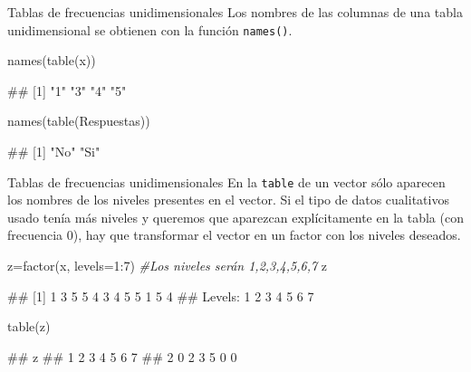 \documentclass[
  ignorenonframetext,
  aspectratio=169]{beamer}
\newenvironment{Shaded}{\begin{snugshade}}{\end{snugshade}}
\newcommand{\AttributeTok}[1]{\textcolor[rgb]{0.77,0.63,0.00}{#1}}
\newcommand{\CommentTok}[1]{\textcolor[rgb]{0.56,0.35,0.01}{\textit{#1}}}
\newcommand{\DecValTok}[1]{\textcolor[rgb]{0.00,0.00,0.81}{#1}}
\newcommand{\FunctionTok}[1]{\textcolor[rgb]{0.00,0.00,0.00}{#1}}
\newcommand{\NormalTok}[1]{#1}
\newcommand{\OtherTok}[1]{\textcolor[rgb]{0.56,0.35,0.01}{#1}}
\newcommand{\SpecialCharTok}[1]{\textcolor[rgb]{0.00,0.00,0.00}{#1}}
\let\oldverbatim\verbatim
\let\endoldverbatim\endverbatim
\renewenvironment{verbatim}{\tiny\oldverbatim}{\endoldverbatim}
\begin{document}
\begin{frame}[fragile]{Tablas de frecuencias unidimensionales}
\protect\hypertarget{tablas-de-frecuencias-unidimensionales-3}{}
Los nombres de las columnas de una tabla unidimensional se obtienen con
la función \texttt{names()}.

\begin{Shaded}
\begin{Highlighting}[]
\FunctionTok{names}\NormalTok{(}\FunctionTok{table}\NormalTok{(x))}
\end{Highlighting}
\end{Shaded}

\begin{verbatim}
## [1] "1" "3" "4" "5"
\end{verbatim}

\begin{Shaded}
\begin{Highlighting}[]
\FunctionTok{names}\NormalTok{(}\FunctionTok{table}\NormalTok{(Respuestas))}
\end{Highlighting}
\end{Shaded}

\begin{verbatim}
## [1] "No" "Si"
\end{verbatim}
\end{frame}

\begin{frame}[fragile]{Tablas de frecuencias unidimensionales}
\protect\hypertarget{tablas-de-frecuencias-unidimensionales-4}{}
En la \texttt{table} de un vector sólo aparecen los nombres de los
niveles presentes en el vector. Si el tipo de datos cualitativos usado
tenía más niveles y queremos que aparezcan explícitamente en la tabla
(con frecuencia 0), hay que transformar el vector en un factor con los
niveles deseados.

\begin{Shaded}
\begin{Highlighting}[]
\NormalTok{z}\OtherTok{=}\FunctionTok{factor}\NormalTok{(x, }\AttributeTok{levels=}\DecValTok{1}\SpecialCharTok{:}\DecValTok{7}\NormalTok{) }\CommentTok{\#Los niveles serán 1,2,3,4,5,6,7 }
\NormalTok{z}
\end{Highlighting}
\end{Shaded}

\begin{verbatim}
##  [1] 1 3 5 5 4 3 4 5 5 1 5 4
## Levels: 1 2 3 4 5 6 7
\end{verbatim}

\begin{Shaded}
\begin{Highlighting}[]
\FunctionTok{table}\NormalTok{(z)}
\end{Highlighting}
\end{Shaded}

\begin{verbatim}
## z
## 1 2 3 4 5 6 7 
## 2 0 2 3 5 0 0
\end{verbatim}
\end{frame}
\end{document}
